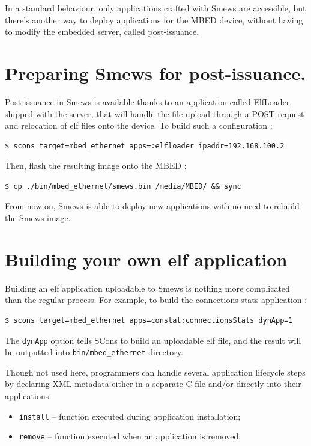 \documentclass{report}
\begin{document}
In a standard behaviour, only applications crafted with Smews are accessible, but there's another way to deploy applications for the MBED device, without having to modify the embedded server, called post-issuance.

\section{Preparing Smews for post-issuance.}
Post-issuance in Smews is available thanks to an application called ElfLoader, shipped with the server, that will handle the file upload through a POST request and relocation of elf files onto the device. To build such a configuration :

\begin{verbatim}
$ scons target=mbed_ethernet apps=:elfloader ipaddr=192.168.100.2
\end{verbatim}

Then, flash the resulting image onto the MBED :
\begin{verbatim}
$ cp ./bin/mbed_ethernet/smews.bin /media/MBED/ && sync
\end{verbatim}

From now on, Smews is able to deploy new applications with no need to rebuild the Smews image.

\section{Building your own elf application}

Building an elf application uploadable to Smews is nothing more complicated than the regular process.
For example, to build the connections stats application :
\begin{verbatim}
$ scons target=mbed_ethernet apps=constat:connectionsStats dynApp=1
\end{verbatim}

The \verb+dynApp+ option tells SCons to build an uploadable elf file, and the result will be outputted into \verb+bin/mbed_ethernet+ directory.

Though not used here, programmers can handle several application lifecycle steps by declaring XML metadata either in a separate C file and/or directly into their applications.
\begin{itemize}
\item \verb+install+ -- function executed during application installation;
\item \verb+remove+ -- function executed when an application is removed;
\end{itemize}
\end{document}
